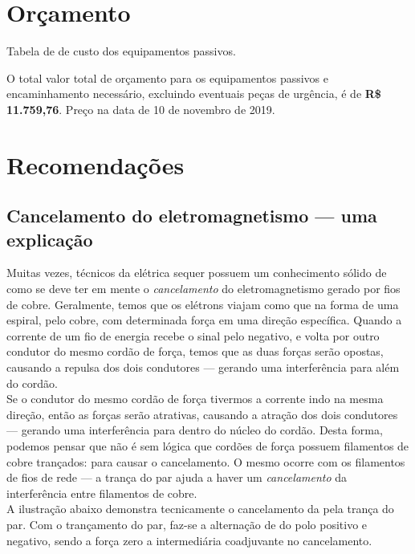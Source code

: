 \documentclass[	DIV=calc,%
							paper=a4,%
							fontsize=12pt,%
							onecolumn]{scrartcl}	 					%
\begin{document}
\section{Orçamento}
Tabela de de custo dos equipamentos passivos.






O total valor total de orçamento para os equipamentos passivos e encaminhamento necessário, excluindo eventuais peças de urgência, é de \textbf{R\$ 11.759,76}.
Preço na data de 10 de novembro de 2019.

\pagebreak

\section{Recomendações}

\subsection{Cancelamento do eletromagnetismo --- uma explicação}

Muitas vezes, técnicos da elétrica sequer possuem um conhecimento sólido de como se deve ter em mente o \textit{cancelamento} do eletromagnetismo gerado por fios de cobre. Geralmente, temos que os elétrons viajam como que na forma de uma espiral, pelo cobre, com determinada força em uma direção específica. Quando a corrente de um fio de energia recebe o sinal pelo negativo, e volta por outro condutor do mesmo cordão de força, temos que as duas forças serão opostas, causando a repulsa dos dois condutores --- gerando uma interferência para além do cordão. 
\\

Se o condutor do mesmo cordão de força tivermos a corrente indo na mesma direção, então as forças serão atrativas, causando a atração dos dois condutores --- gerando uma interferência para dentro do núcleo do cordão. Desta forma, podemos pensar que não é sem lógica que cordões de força possuem filamentos de cobre trançados: para causar o cancelamento. O mesmo ocorre com os filamentos de fios de rede --- a trança do par ajuda a haver um \textit{cancelamento} da interferência entre filamentos de cobre.
\\

A ilustração abaixo demonstra tecnicamente o cancelamento da pela trança do par. Com o trançamento do par, faz-se a alternação de do polo positivo e negativo, sendo a força zero a intermediária coadjuvante no cancelamento.
\\
\end{document}
